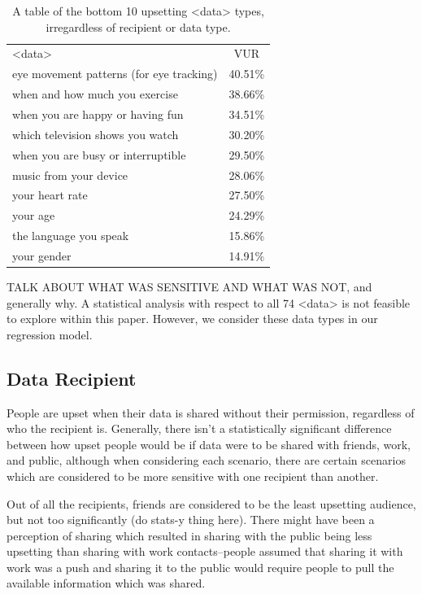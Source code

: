 \documentclass{acm_proc_article-sp}
\begin{document}
\begin{table}%
\begin{center}
\begin{tabular}{| l | c |}
<data> &  VUR  \\
eye movement patterns (for eye tracking) & 40.51\% \\
when and how much you exercise  & 38.66\% \\
when you are happy or having fun  & 34.51\% \\
which television shows you watch & 30.20\% \\
when you are busy or interruptible  & 29.50\% \\
music from your device  & 28.06\% \\
your heart rate & 27.50\% \\
your age & 24.29\% \\
the language you speak & 15.86\% \\
your gender & 14.91\% \\ 

\end{tabular}
\caption{A table of the bottom 10 upsetting <data> types, irregardless of recipient or data type.}
\label{bottom10}
\end{center}
\end{table}

TALK ABOUT WHAT WAS SENSITIVE AND WHAT WAS NOT, and generally why. A statistical analysis with respect to all 74 <data> is not feasible to explore within this paper. However, we consider these data types in our regression model.  

\subsection{Data Recipient}
People are upset when their data is shared without their permission, regardless of who the recipient is. Generally, there isn't a statistically significant difference between how upset people would be if data were to be shared with friends, work, and public, although when considering each scenario, there are certain scenarios which are considered to be more sensitive with one recipient than another.

Out of all the recipients, friends are considered to be the least upsetting audience, but not too significantly (do stats-y thing here). There might have been a perception of sharing which resulted in sharing with the public being less upsetting than sharing with work contacts--people assumed that sharing it with work was a push and sharing it to the public would require people to pull the available information which was shared.
\end{document}
